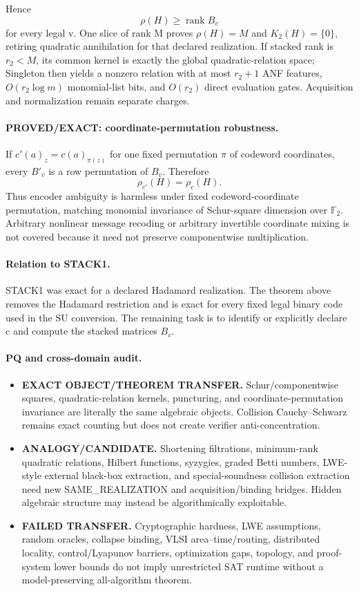 \documentclass[11pt]{article}
\begin{document}
Hence
\[
\rho(H)\ge \operatorname{rank}B_v
\]
for every legal v. One slice of rank M proves \(\rho(H)=M\) and \(K_2(H)=\{0\}\), retiring quadratic annihilation for that declared realization. If stacked rank is \(r_2<M\), its common kernel is exactly the global quadratic-relation space; Singleton then yields a nonzero relation with at most \(r_2+1\) ANF features, \(O(r_2\log m)\) monomial-list bits, and \(O(r_2)\) direct evaluation gates. Acquisition and normalization remain separate charges.

\paragraph{PROVED/EXACT: coordinate-permutation robustness.}
If \(c'(a)_z=c(a)_{\pi(z)}\) for one fixed permutation \(\pi\) of codeword coordinates, every \(B'_v\) is a row permutation of \(B_v\). Therefore
\[
\boxed{\rho_{c'}(H)=\rho_c(H).}
\]
Thus encoder ambiguity is harmless under fixed codeword-coordinate permutation, matching monomial invariance of Schur-square dimension over \(\mathbb F_2\). Arbitrary nonlinear message recoding or arbitrary invertible coordinate mixing is not covered because it need not preserve componentwise multiplication.

\paragraph{Relation to STACK1.}
STACK1 was exact for a declared Hadamard realization. The theorem above removes the Hadamard restriction and is exact for every fixed legal binary code used in the SU conversion. The remaining task is to identify or explicitly declare c and compute the stacked matrices \(B_v\).

\paragraph{PQ and cross-domain audit.}
\begin{itemize}
\item[] \textbf{EXACT OBJECT/THEOREM TRANSFER.} Schur/componentwise squares, quadratic-relation kernels, puncturing, and coordinate-permutation invariance are literally the same algebraic objects. Collision Cauchy--Schwarz remains exact counting but does not create verifier anti-concentration.
\item[] \textbf{ANALOGY/CANDIDATE.} Shortening filtrations, minimum-rank quadratic relations, Hilbert functions, syzygies, graded Betti numbers, LWE-style external black-box extraction, and special-soundness collision extraction need new SAME\_REALIZATION and acquisition/binding bridges. Hidden algebraic structure may instead be algorithmically exploitable.
\item[] \textbf{FAILED TRANSFER.} Cryptographic hardness, LWE assumptions, random oracles, collapse binding, VLSI area--time/routing, distributed locality, control/Lyapunov barriers, optimization gaps, topology, and proof-system lower bounds do not imply unrestricted SAT runtime without a model-preserving all-algorithm theorem.
\end{itemize}
\end{document}
